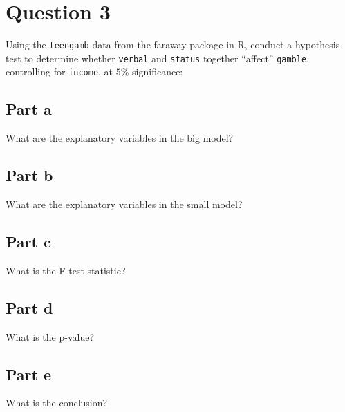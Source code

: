 \section{Question 3}

\begin{question}
    Using the \verb+teengamb+ data from the faraway package in R, conduct a hypothesis test to determine whether \verb+verbal+ and \verb+status+ together “affect” \verb+gamble+, controlling for \verb+income+, at $5\%$ significance:
\end{question}

\subsection{Part a}

\begin{question}
    What are the explanatory variables in the big model?
\end{question}

\begin{answer}
    
\end{answer}

\subsection{Part b}

\begin{question}
    What are the explanatory variables in the small model?
\end{question}

\begin{answer}
    
\end{answer}

\subsection{Part c}

\begin{question}
    What is the F test statistic?
\end{question}

\begin{answer}
    
\end{answer}

\subsection{Part d}

\begin{question}
    What is the p-value?
\end{question}

\begin{answer}
    
\end{answer}

\subsection{Part e}

\begin{question}
    What is the conclusion?
\end{question}

\begin{answer}
    
\end{answer}